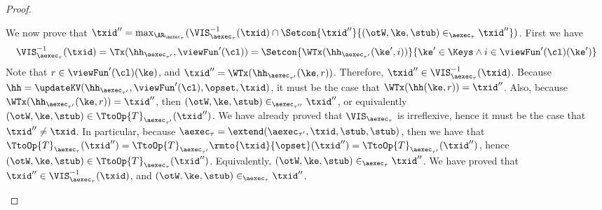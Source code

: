 \begin{proof}
\begin{itemize}
\begin{itemize}
We now prove that 
$\txid'' = \max_{\AR_{\aexec_{\tau}}}(\VIS^{-1}_{\aexec_{\tau}}(\txid) \cap \Setcon{ \txid'' }{ (\otW, \ke, \stub) \in_{\aexec_{\tau}} \txid''})$. 
First we have
\[ 
\begin{array}{l}
\VIS^{-1}_{\aexec_{\tau}}(\txid) = 
\Tx(\hh_{\aexec_{\tau'}}, \viewFun'(\cl)) = 
\Setcon{\WTx(\hh_{\aexec_{\tau'}}(\ke',  i)) }{ \ke' \in \Keys \wedge  i \in \viewFun'(\cl)(\ke')}
\end{array}
\]
Note that $r \in \viewFun'(\cl)(\ke)$, and $\txid'' = \WTx(\hh_{\aexec_{\tau'}}(\ke, r))$. 
Therefore, $\txid'' \in \VIS^{-1}_{\aexec_{\tau}}(\txid)$. 
Because $\hh = \updateKV(\hh_{\aexec_{\tau'}}, \viewFun'(\cl), \opset, \txid)$, it 
must be the case that $\WTx(\hh(\ke, r)) = \txid''$. Also, because $\WTx(\hh_{\aexec_{\tau'}}(\ke, r)) = \txid''$, 
then $(\otW, \ke, \stub) \in_{\aexec_{\tau''}} \txid''$, or equivalently $(\otW, \ke, \stub) \in \TtoOp{T}_{\aexec_{\tau'}}(\txid'')$. 
We have already proved that $\VIS_{\aexec_{\tau}}$ is irreflexive, hence it must be the case that $\txid'' \neq \txid$. 
In particular, because $\aexec_{\tau} = \extend(\aexec_{\tau'}, \txid, \stub, \stub)$, then we have that 
$\TtoOp{T}_{\aexec_{\tau}}(\txid'') = \TtoOp{T}_{\aexec_{\tau'}}\rmto{\txid}{\opset}(\txid'') = 
\TtoOp{T}_{\aexec_{\tau'}}(\txid'')$, hence $(\otW, \ke, \stub) \in \TtoOp{T}_{\aexec_{\tau}}(\txid'')$. Equivalently, 
$(\otW, \ke, \stub) \in_{\aexec_{\tau}} \txid''$. We have proved that $\txid'' \in \VIS^{-1}_{\aexec_{\tau}}(\txid)$, 
and $(\otW, \ke, \stub) \in_{\aexec_{\tau}} \txid''$. 


\end{itemize}
\end{itemize}
\end{proof}
